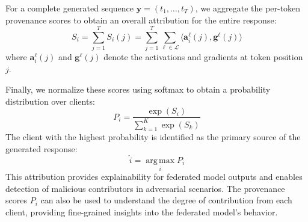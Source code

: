 For a complete generated sequence $\mathbf{y} = (t_1, \ldots, t_T)$, we aggregate the per-token provenance scores to obtain an overall attribution for the entire response:
\begin{equation}
\label{eq:sequence-aggregation}
S_i = \sum_{j=1}^T S_i(j) = \sum_{j=1}^T \sum_{\ell \in \mathcal{L}} \langle \mathbf{a}_i^\ell(j), \mathbf{g}^\ell(j) \rangle
\end{equation}
where $\mathbf{a}_i^\ell(j)$ and $\mathbf{g}^\ell(j)$ denote the activations and gradients at token position $j$.

Finally, we normalize these scores using softmax to obtain a probability distribution over clients:
\begin{equation}
\label{eq:provenance-probability}
P_i = \frac{\exp(S_i)}{\sum_{k=1}^K \exp(S_k)}
\end{equation}
The client with the highest probability is identified as the primary source of the generated response:
\begin{equation}
\label{eq:attribution}
\hat{i} = \operatorname*{arg\,max}_{i} P_i
\end{equation}
This attribution provides explainability for federated model outputs and enables detection of malicious contributors in adversarial scenarios. The provenance scores $P_i$ can also be used to understand the degree of contribution from each client, providing fine-grained insights into the federated model's behavior.
